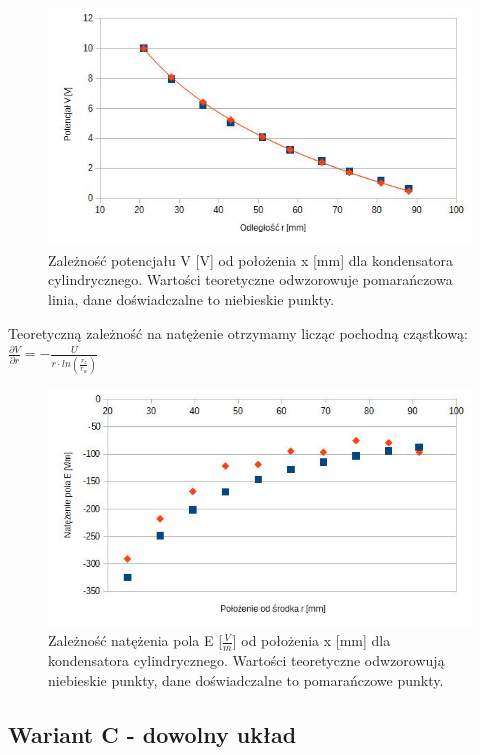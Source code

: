 \documentclass{article}
\begin{document}
\begin{figure}[h!]
	\centering
	\includegraphics[scale=0.55]{ch03}
	\caption{Zależność potencjału V [V] od położenia x [mm] dla kondensatora cylindrycznego. Wartości teoretyczne odwzorowuje pomarańczowa linia, dane doświadczalne to niebieskie punkty.}
\end{figure}

Teoretyczną zależność na natężenie otrzymamy licząc pochodną cząstkową: $\frac{\partial V}{\partial r} = -\frac{U}{r \cdot ln(\frac{r_{z}}{r_{w}})}$

\begin{figure}[h!]
	\centering
	\includegraphics[scale=0.45]{ch04}
	\caption{Zależność natężenia pola E [$\frac{V}{m}$] od położenia x [mm] dla kondensatora cylindrycznego. Wartości teoretyczne odwzorowują niebieskie punkty, dane doświadczalne to pomarańczowe punkty.}
\end{figure}


\subsection{Wariant C - dowolny układ}
\end{document}
